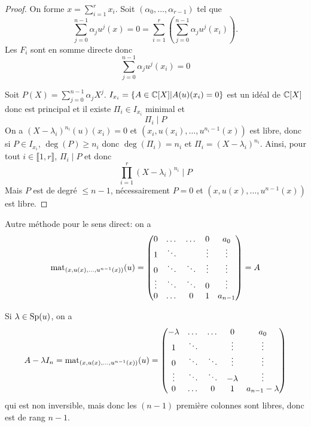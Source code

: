 \documentclass[12pt]{article}
\begin{document}
\begin{proof}
	On forme $x=\sum_{i=1}^{r}x_{i}$. Soit $(\alpha_{0},\dots,\alpha_{r-1})$ tel que 
	\begin{equation*}
		\sum_{j=0}^{n-1}\alpha_{j}u^{j}(x)=0=\sum_{i=1}^{r}\left(\sum_{j=0}^{n-1}\alpha_{j}u^{j}(x_{i})\right).	
	\end{equation*}
	Les $F_{i}$ sont en somme directe donc 
	\begin{equation}
		\sum_{j=0}^{n-1}\alpha_{j}u^{j}(x_{i})=0
	\end{equation}

	Soit $P(X)=\sum_{j=0}^{n-1}\alpha_{j}X^{j}$. $I_{x_{i}}=\left\lbrace A\in\mathbb{C}[X]\middle| A(u)(x_{i})=0\right\rbrace$ est un idéal de $\mathbb{C}[X]$ donc est principal et il existe $\Pi_{i}\in I_{x_{i}}$ minimal et 
	\begin{equation}
		\Pi_{i}\mid P
	\end{equation}
	On a $(X-\lambda_{i})^{n_{i}}(u)(x_{i})=0$ et $(x_{i},u(x_{i}),\dots,u^{n_{i}-1}(x))$ est libre, donc si $P\in I_{x_{i}}$, $\deg(P)\geqslant n_{i}$ donc $\deg(\Pi_{i})=n_{i}$ et $\Pi_{i}=(X-\lambda_{i})^{n_{i}}$. Ainsi, pour tout $i\in\llbracket1,r\rrbracket$, $\Pi_{i}\mid P$ et donc 
	\begin{equation}
		\prod_{i=1}^{r}(X-\lambda_{i})^{n_{i}}\mid P
	\end{equation}
	Mais $P$ est de degré $\leqslant n-1$, nécessairement $P=0$ et $(x,u(x),\dots,u^{n-1}(x))$ est libre.
\end{proof}

\begin{remark}
	Autre méthode pour le sens direct: on a 
	\begin{equation}
		\operatorname{mat}_{(x,u(x),\dots,u^{n-1}(x))}(u)=
		\begin{pmatrix}
			0&\dots&\dots&0&a_{0}\\
			1&\ddots&&\vdots&\vdots\\
			0&\ddots&\ddots&\vdots&\vdots\\
			\vdots&\ddots&\ddots&0&\vdots\\
			0&\dots&0&1&a_{n-1}
		\end{pmatrix}=A
	\end{equation}

	Si $\lambda\in\operatorname{Sp}(u)$, on a 
	\begin{equation}
		A-\lambda I_{n}=
		\operatorname{mat}_{(x,u(x),\dots,u^{n-1}(x))}(u)=
		\begin{pmatrix}
			-\lambda&\dots&\dots&0&a_{0}\\
			1&\ddots&&\vdots&\vdots\\
			0&\ddots&\ddots&\vdots&\vdots\\
			\vdots&\ddots&\ddots&-\lambda&\vdots\\
			0&\dots&0&1&a_{n-1}-\lambda
		\end{pmatrix}
	\end{equation}
	qui est non inversible, mais donc les $(n-1)$ première colonnes sont libres, donc est de rang $n-1$.
\end{remark}
\end{document}
